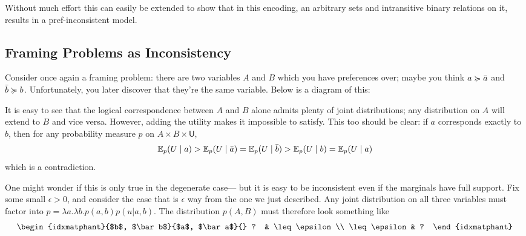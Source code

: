 \documentclass{article}
\begin{document}
	Without much effort this can easily be extended to show that in this encoding, an arbitrary sets and intransitive binary relations on it, results in a pref-inconsistent model.



	




	\subsection{Framing Problems as Inconsistency}
	Consider once again a framing problem: there are two variables $A$ and $B$ which you have preferences over; maybe you think $a \succcurlyeq \bar a$ and $\bar b \succcurlyeq b$. Unfortunately, you later discover that they're the same variable. Below is a diagram of this:
	\begin{center}
	\end{center}
	It is easy to see that the logical correspondence between $A$ and $B$ alone admits plenty of joint distributions; any distribution on $A$ will extend to $B$ and vice versa. However, adding the utility makes it impossible to satisfy. This too should be clear: if $a$ corresponds exactly to $b$, then for any probability measure $p$ on $A \times B \times \mathsf U$,
	\[ {\mathbb E}_p(U \mid a) > {\mathbb E}_p(U \mid \bar a) = {\mathbb E}_p(U \mid \bar b) > {\mathbb E}_p(U \mid b) = {\mathbb E}_p(U \mid a) \]
	which is a contradiction.
	
	One might wonder if this is only true in the degenerate case--- but it is easy to be inconsistent even if the marginals have full support. Fix some small $\epsilon > 0$, and consider the case that is $\epsilon$ way from the one we just described. 
	Any joint distribution on all three variables must factor into $p = \lambda a. \lambda b. p(a, b) p(u | a,b)$. The distribution $p(A, B)$ must therefore look something like
	\[ \begin{idxmatphant}{$b$, $\bar b$}{$a$, $\bar a$}{} ? & \leq\epsilon \\ \leq\epsilon & ?
	\end{idxmatphant}\]
	
\end{document}
